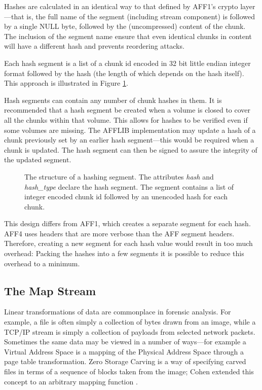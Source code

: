\documentclass[10pt, conference]{IEEEtran}
\begin{document}
Hashes are calculated in an identical way to that defined by AFF1's
crypto layer\cite{garfinkel:affcrypto}---that is, the full name of the
segment (including stream component) is followed by a single NULL
byte, followed by the (uncompressed) content of the chunk. The
inclusion of the segment name ensure that even identical chunks in
content will have a different hash and prevents reordering attacks.

Each hash segment is a list of a chunk id encoded in 32 bit
little endian integer format followed by the hash (the length of which
depends on the hash itself). This approach is illustrated in Figure
\ref{hash_index}. 

Hash segments can contain any number of chunk hashes in them. It is
recommended that a hash segment be created when a volume is closed to
cover all the chunks within that volume. This allows for hashes to be
verified even if some volumes are missing. The AFFLIB implementation
may update a hash of a chunk previously set by an earlier hash
segment---this would be required when a chunk is updated. The hash
segment can then be signed to assure the integrity of the updated segment.

\begin{figure}[tb]
  \begin{center}
  \mbox{\columnwidth {}}
  \caption{The structure of a hashing segment. The attributes {\em
  hash} and {\em hash\_type} declare the hash segment. The segment
  contains a list of integer encoded chunk id followed by an unencoded
  hash for each chunk.}
  \label{hash_index}
  \end{center}
\end{figure}

This design differs from AFF1, which creates a separate segment for
each hash. AFF4 uses headers that are more verbose than the AFF
segment headers. Therefore, creating a new segment for each hash value
would result in too much overhead: Packing the hashes into a few
segments it is possible to reduce this overhead to a minimum.

\subsection{The Map Stream}
\label{map_stream}
Linear transformations of data are commonplace in forensic
analysis. For example, a file is often simply a collection of bytes
drawn from an image, while a TCP/IP stream is simply a collection of
payloads from selected network packets. 
Sometimes the same data may be
viewed in a number of ways---for example a Virtual Address Space is a
mapping of the Physical Address Space through a page table
transformation.  Zero Storage Carving \cite{Meijer2006} is a way of
specifying carved files in terms of a sequence of blocks taken from
the image; Cohen extended this concept to an arbitrary
mapping function\cite{Cohen2007} . 
\end{document}
